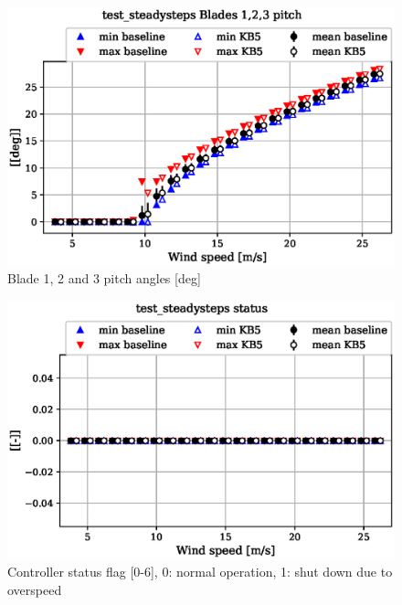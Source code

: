 \begin{figure}[!ht]
\begin{center}
	\includegraphics[width=.85\linewidth]{figures/baseline-vs-KB6/test_steadysteps/bearing-pitch1-angle-deg_AA0007_AA0003.eps}
\end{center}
\caption{Blade 1, 2 and 3 pitch angles [deg]}
\label{fig:baseline-vs-KB6:test_steadysteps:pitch}
\end{figure}

\begin{figure}[!ht]
\begin{center}
	\includegraphics[width=.85\linewidth]{figures/baseline-vs-KB6/test_steadysteps/DLL-dtu_we_controller-inpvec-22_AA0007_AA0003.eps}
\end{center}
\caption{Controller status flag [0-6], 0: normal operation, 1: shut down due to overspeed}
\label{fig:baseline-vs-KB6:test_steadysteps:status}
\end{figure}

